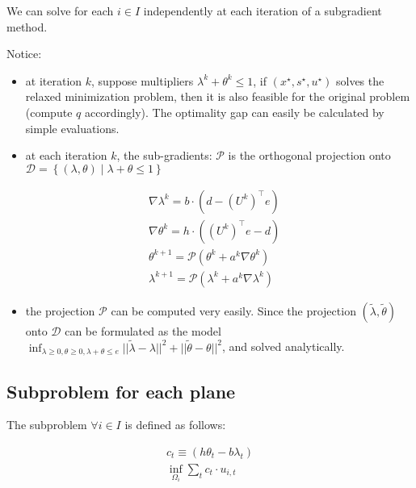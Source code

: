 \documentclass[
  a4paper,
,tablecaptionabove
]{scrartcl}
\numberwithin{equation}{section}
\providecommand{\tightlist}{%
  \setlength{\itemsep}{0pt}\setlength{\parskip}{0pt}}
\begin{document}
We can solve for each \(i\in I\) independently at each iteration of a
subgradient method.

Notice:

\begin{itemize}
  \tightlist
  \item
        at iteration \(k\), suppose multipliers
        \(\lambda^k + \theta^k \le 1\), if \(( x^\star, s^\star, u^\star)\)
        solves the relaxed minimization problem, then it is also feasible for
        the original problem (compute \(q\) accordingly). The optimality gap
        can easily be calculated by simple evaluations.
  \item
        at each iteration \(k\), the sub-gradients: \(\mathcal P\) is the
        orthogonal projection onto
        \(\mathcal D =\left\{(\lambda, \theta) \;| \; \lambda + \theta \le 1\right\}\)
\end{itemize}

\[\begin{aligned}
     & \nabla \lambda^k = b\cdot \left(d -  (U^k)^\top e\right)     \\
     & \nabla \theta^k = h\cdot \left((U^k)^\top e - d\right)       \\
     & \theta^{k+1} = \mathcal P (\theta^k + a^k\nabla\theta^k )    \\
     & \lambda^{k+1} = \mathcal P (\lambda^k + a^k\nabla\lambda^k )
  \end{aligned}\]

\begin{itemize}
  \tightlist
  \item
        the projection \(\mathcal P\) can be computed very easily. Since the
        projection \((\tilde\lambda, \tilde\theta)\) onto \(\mathcal D\) can
        be formulated as the model
        \(\inf_{\lambda\ge 0, \theta \ge 0, \lambda + \theta \le e} ||\tilde\lambda-\lambda||^2 + ||\tilde\theta - \theta||^2\),
        and solved analytically.
\end{itemize}

\hypertarget{sec:subproblem-for-each-plane}{%
  \subsection{Subproblem for each plane}\label{subproblem-for-each-plane}}

The subproblem \(\forall i\in I\) is defined as follows:

\[\begin{aligned}
    c_t \equiv (h\theta_t - b\lambda_t) \\
    \inf_{\Omega_i} \sum_t c_t \cdot u_{i,t}
  \end{aligned}\]
\end{document}
